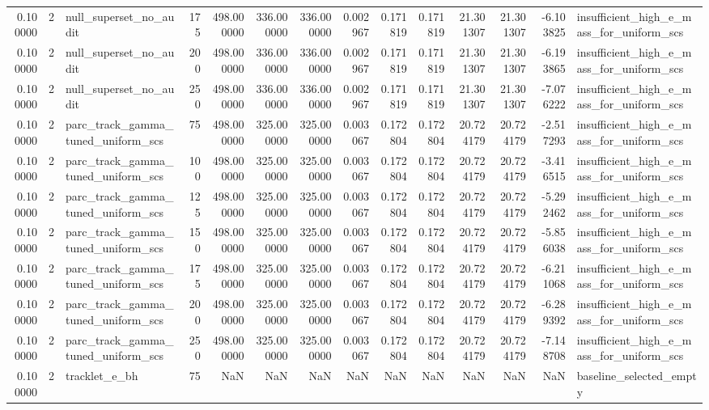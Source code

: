 \begin{tabular}{rrlrrrrrrrrrrl}
0.100000 & 2 & null_superset_no_audit & 175 & 498.000000 & 336.000000 & 336.000000 & 0.002967 & 0.171819 & 0.171819 & 21.301307 & 21.301307 & -6.103825 & insufficient_high_e_mass_for_uniform_scs \\
0.100000 & 2 & null_superset_no_audit & 200 & 498.000000 & 336.000000 & 336.000000 & 0.002967 & 0.171819 & 0.171819 & 21.301307 & 21.301307 & -6.193865 & insufficient_high_e_mass_for_uniform_scs \\
0.100000 & 2 & null_superset_no_audit & 250 & 498.000000 & 336.000000 & 336.000000 & 0.002967 & 0.171819 & 0.171819 & 21.301307 & 21.301307 & -7.076222 & insufficient_high_e_mass_for_uniform_scs \\
0.100000 & 2 & parc_track_gamma_tuned_uniform_scs & 75 & 498.000000 & 325.000000 & 325.000000 & 0.003067 & 0.172804 & 0.172804 & 20.724179 & 20.724179 & -2.517293 & insufficient_high_e_mass_for_uniform_scs \\
0.100000 & 2 & parc_track_gamma_tuned_uniform_scs & 100 & 498.000000 & 325.000000 & 325.000000 & 0.003067 & 0.172804 & 0.172804 & 20.724179 & 20.724179 & -3.416515 & insufficient_high_e_mass_for_uniform_scs \\
0.100000 & 2 & parc_track_gamma_tuned_uniform_scs & 125 & 498.000000 & 325.000000 & 325.000000 & 0.003067 & 0.172804 & 0.172804 & 20.724179 & 20.724179 & -5.292462 & insufficient_high_e_mass_for_uniform_scs \\
0.100000 & 2 & parc_track_gamma_tuned_uniform_scs & 150 & 498.000000 & 325.000000 & 325.000000 & 0.003067 & 0.172804 & 0.172804 & 20.724179 & 20.724179 & -5.856038 & insufficient_high_e_mass_for_uniform_scs \\
0.100000 & 2 & parc_track_gamma_tuned_uniform_scs & 175 & 498.000000 & 325.000000 & 325.000000 & 0.003067 & 0.172804 & 0.172804 & 20.724179 & 20.724179 & -6.211068 & insufficient_high_e_mass_for_uniform_scs \\
0.100000 & 2 & parc_track_gamma_tuned_uniform_scs & 200 & 498.000000 & 325.000000 & 325.000000 & 0.003067 & 0.172804 & 0.172804 & 20.724179 & 20.724179 & -6.289392 & insufficient_high_e_mass_for_uniform_scs \\
0.100000 & 2 & parc_track_gamma_tuned_uniform_scs & 250 & 498.000000 & 325.000000 & 325.000000 & 0.003067 & 0.172804 & 0.172804 & 20.724179 & 20.724179 & -7.148708 & insufficient_high_e_mass_for_uniform_scs \\
0.100000 & 2 & tracklet_e_bh & 75 & NaN & NaN & NaN & NaN & NaN & NaN & NaN & NaN & NaN & baseline_selected_empty \\

\end{tabular}
